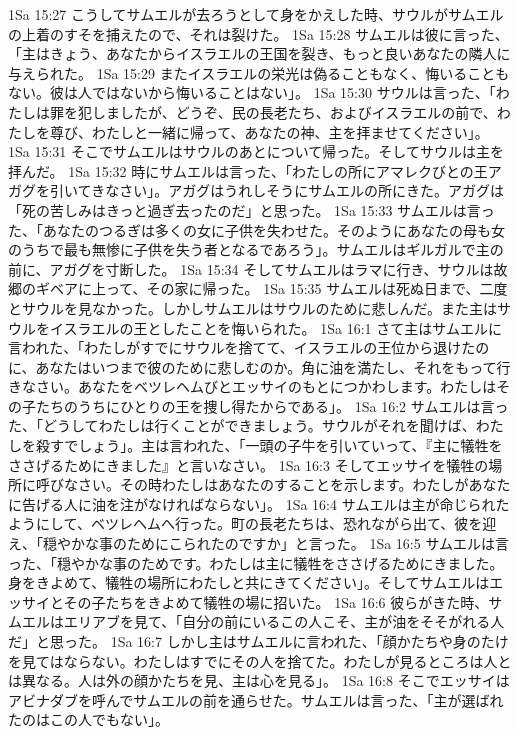 1Sa 15:27  こうしてサムエルが去ろうとして身をかえした時、サウルがサムエルの上着のすそを捕えたので、それは裂けた。
1Sa 15:28  サムエルは彼に言った、「主はきょう、あなたからイスラエルの王国を裂き、もっと良いあなたの隣人に与えられた。
1Sa 15:29  またイスラエルの栄光は偽ることもなく、悔いることもない。彼は人ではないから悔いることはない」。
1Sa 15:30  サウルは言った、「わたしは罪を犯しましたが、どうぞ、民の長老たち、およびイスラエルの前で、わたしを尊び、わたしと一緒に帰って、あなたの神、主を拝ませてください」。
1Sa 15:31  そこでサムエルはサウルのあとについて帰った。そしてサウルは主を拝んだ。
1Sa 15:32  時にサムエルは言った、「わたしの所にアマレクびとの王アガグを引いてきなさい」。アガグはうれしそうにサムエルの所にきた。アガグは「死の苦しみはきっと過ぎ去ったのだ」と思った。
1Sa 15:33  サムエルは言った、「あなたのつるぎは多くの女に子供を失わせた。そのようにあなたの母も女のうちで最も無惨に子供を失う者となるであろう」。サムエルはギルガルで主の前に、アガグを寸断した。
1Sa 15:34  そしてサムエルはラマに行き、サウルは故郷のギベアに上って、その家に帰った。
1Sa 15:35  サムエルは死ぬ日まで、二度とサウルを見なかった。しかしサムエルはサウルのために悲しんだ。また主はサウルをイスラエルの王としたことを悔いられた。
1Sa 16:1  さて主はサムエルに言われた、「わたしがすでにサウルを捨てて、イスラエルの王位から退けたのに、あなたはいつまで彼のために悲しむのか。角に油を満たし、それをもって行きなさい。あなたをベツレヘムびとエッサイのもとにつかわします。わたしはその子たちのうちにひとりの王を捜し得たからである」。
1Sa 16:2  サムエルは言った、「どうしてわたしは行くことができましょう。サウルがそれを聞けば、わたしを殺すでしょう」。主は言われた、「一頭の子牛を引いていって、『主に犠牲をささげるためにきました』と言いなさい。
1Sa 16:3  そしてエッサイを犠牲の場所に呼びなさい。その時わたしはあなたのすることを示します。わたしがあなたに告げる人に油を注がなければならない」。
1Sa 16:4  サムエルは主が命じられたようにして、ベツレヘムへ行った。町の長老たちは、恐れながら出て、彼を迎え、「穏やかな事のためにこられたのですか」と言った。
1Sa 16:5  サムエルは言った、「穏やかな事のためです。わたしは主に犠牲をささげるためにきました。身をきよめて、犠牲の場所にわたしと共にきてください」。そしてサムエルはエッサイとその子たちをきよめて犠牲の場に招いた。
1Sa 16:6  彼らがきた時、サムエルはエリアブを見て、「自分の前にいるこの人こそ、主が油をそそがれる人だ」と思った。
1Sa 16:7  しかし主はサムエルに言われた、「顔かたちや身のたけを見てはならない。わたしはすでにその人を捨てた。わたしが見るところは人とは異なる。人は外の顔かたちを見、主は心を見る」。
1Sa 16:8  そこでエッサイはアビナダブを呼んでサムエルの前を通らせた。サムエルは言った、「主が選ばれたのはこの人でもない」。
